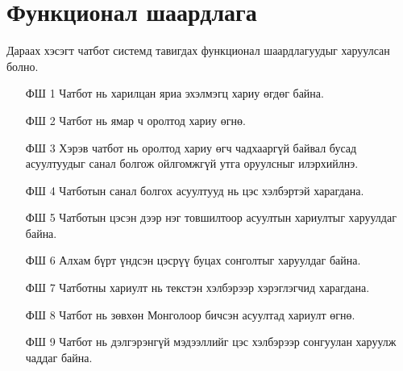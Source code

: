 \section{Функционал шаардлага}
Дараах хэсэгт чатбот системд тавигдах функционал шаардлагуудыг харуулсан болно.
\begin{itemize}
  \item[ФШ 1] Чатбот нь харилцан яриа эхэлмэгц хариу өгдөг байна. 
  \item[ФШ 2] Чатбот нь ямар ч оролтод хариу өгнө.
  \item[ФШ 3] Хэрэв чатбот нь оролтод хариу өгч чадхааргүй байвал бусад асуултуудыг санал болгож ойлгомжгүй утга оруулсныг илэрхийлнэ.
  \item[ФШ 4] Чатботын санал болгох асуултууд нь цэс хэлбэртэй харагдана.
  \item[ФШ 5] Чатботын цэсэн дээр нэг товшилтоор асуултын хариултыг харуулдаг байна.  
  \item[ФШ 6] Алхам бүрт үндсэн цэсрүү буцах сонголтыг харуулдаг байна. 
  \item[ФШ 7] Чатботны хариулт нь текстэн хэлбэрээр хэрэглэгчид харагдана.
  \item[ФШ 8] Чатбот нь зөвхөн Монголоор бичсэн асуултад хариулт өгнө.
  \item[ФШ 9] Чатбот нь дэлгэрэнгүй мэдээллийг цэс хэлбэрээр сонгуулан харуулж чаддаг байна. 
  
\end{itemize}
